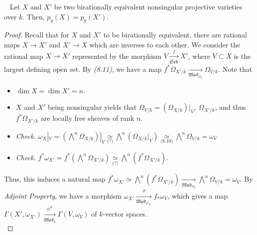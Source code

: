 \documentclass[11pt,a4paper,footinclude=true,headinclude=true]{scrbook} %
\newcommand{\OO}{\mathcal{O}}
\newcommand{\Sch}{\mathfrak{Sch}}
\newcommand{\<}{\langle}
\newcommand{\>}{\rangle}
\newcommand{\MOD}{\mathfrak{Mod}}
\newenvironment{theorem}[2][]
{\renewcommand\theinnercustomthm{#2}\innercustomthm[#1]
\begin{mdframed}[backgroundcolor=yellow!20]\ }
{\end{mdframed}\endinnercustomthm}
\begin{document}
\begin{theorem}{8.19}
    Let $X$ and $X'$ be two birationally equivalent nonsingular projective varieties over $k$. Then, $p_g(X)=p_g(X')$.
\end{theorem}
\begin{proof}
    Recall that for $X$ and $X'$ to be birationally equivalent, there are rational maps $X\to X'$ and $X'\to X$ which are inverses to each other. We consider the rational map $X\to X'$ represented by the morphism $V\xrightarrow[\Sch]{f}X'$, where $V\subset X$ is the largest defining open set. By \textit{(8.11)}, we have a map $f^\ast\Omega_{X'/k}\xrightarrow[\MOD_{\OO_V}]{}\Omega_{V/k}$. Note that
    \begin{itemize}
        \item $\dim X=\dim X'=n$.
        \item $X$ and $X'$ being nonsingular yields that $\Omega_{V/k}=(\Omega_{X/k})|_V,\ \Omega_{X'/k}$, and thus $f^\ast\Omega_{X'/k}$ are locally free sheaves of rank $n$.
        \item \textit{Check.} $\omega_X|_V=(\bigwedge^n\Omega_{X/k})|_V\underset{\text{(?)}}{\simeq}\bigwedge^n(\Omega_{X/k}|_V)\underset{\text{(8.10)}}{\simeq}\bigwedge^n\Omega_{V/k}=\omega_V$
        \item \textit{Check.} $f^\ast\omega_{X'}=f^\ast(\bigwedge^n\Omega_{X'/k})\underset{\text{(?)}}{\simeq}\bigwedge^n(f^\ast\Omega_{X'/k})$.
    \end{itemize}
    Thus, this induces a natural map $f^\ast\omega_{X'}\simeq\bigwedge^n(f^\ast\Omega_{X'/k})\xrightarrow[\MOD_{\OO_V}]{}\bigwedge^n\Omega_{V/k}=\omega_V$. By \textit{Adjoint Property}, we have a morphism $\omega_{X'}\xrightarrow[\MOD_{\OO_{X'}}]{\phi}f_\ast\omega_V$, which gives a map $\Gamma(X',\omega_{X'})\xrightarrow[\MOD_k]{\phi^\#}\Gamma(V,\omega_V)$ of $k$-vector spaces.\\
    

\end{proof}
\end{document}
